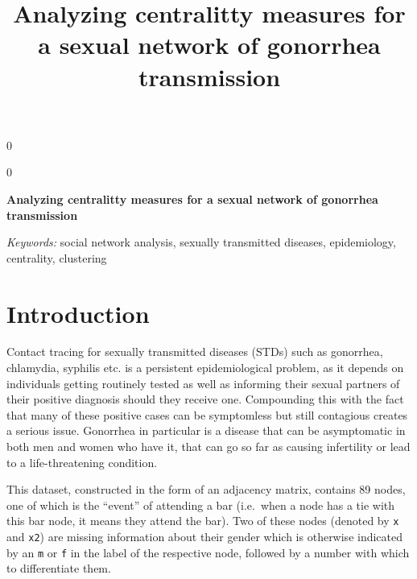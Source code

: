 \documentclass[12pt]{article}
\newcommand{\blind}{0}
\begin{document}
\def\spacingset#1{\renewcommand{\baselinestretch}%
{#1}\small\normalsize} \spacingset{1}



\blind
{
  \title{\bf Analyzing centralitty measures for a sexual network of gonorrhea transmission}

  \author{
      }
  \maketitle
} \fi

\blind
{
  \bigskip
  \bigskip
  \bigskip
  \begin{center}
    {\LARGE\bf Analyzing centralitty measures for a sexual network of gonorrhea transmission}
  \end{center}
  \medskip
} \fi

\bigskip
\begin{abstract}

\end{abstract}

\noindent%
{\it Keywords:} social network analysis, sexually transmitted diseases, epidemiology, centrality, clustering
\vfill

\newpage
\spacingset{1.45} %

\hypertarget{introduction}{%
\section{Introduction}\label{introduction}}

Contact tracing for sexually transmitted diseases (STDs) such as gonorrhea, chlamydia, syphilis etc. is a persistent epidemiological problem, as it depends on individuals getting routinely tested as well as informing their sexual partners of their positive diagnosis should they receive one. Compounding this with the fact that many of these positive cases can be symptomless but still contagious creates a serious issue. Gonorrhea in particular is a disease that can be asymptomatic in both men and women who have it, that can go so far as causing infertility or lead to a life-threatening condition.

This dataset, constructed in the form of an adjacency matrix, contains 89 nodes, one of which is the ``event'' of attending a bar (i.e.~when a node has a tie with this bar node, it means they attend the bar). Two of these nodes (denoted by \texttt{x} and \texttt{x2}) are missing information about their gender which is otherwise indicated by an \texttt{m} or \texttt{f} in the label of the respective node, followed by a number with which to differentiate them.
\end{document}
